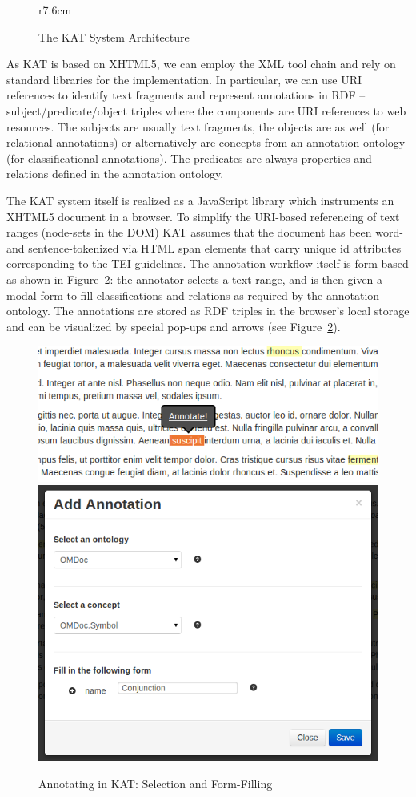 \documentclass{llncs}
\def\KAT{\textsf{KAT}\xspace}
\begin{document}
\begin{figure}r{7.6cm}\vspace*{-2em}
\def\localxscale{.85}\def\localyscale{1.35}
\caption{The \KAT System Architecture}\label{fig:kat-arch}\vspace*{-1em}
\end{figure}
As \KAT is based on XHTML5, we can employ the XML tool chain and rely on standard libraries
for the implementation. In particular, we can use URI references to identify text
fragments and represent annotations in RDF -- subject/predicate/object triples where the
components are URI references to web resources. The subjects are usually text fragments,
the objects are as well (for relational annotations) or alternatively are concepts from an annotation ontology (for
classificational annotations). The predicates are always properties and relations defined in the annotation ontology.

The \KAT system itself is realized as a JavaScript library which instruments an XHTML5
document in a browser. To simplify the URI-based referencing of text ranges (node-sets in
the DOM) \KAT assumes that the document has been word- and sentence-tokenized via
HTML \textsf{span} elements that carry unique \textsf{id} attributes corresponding to the
TEI guidelines. The annotation workflow itself is
form-based as shown in Figure~\ref{fig:kat-annotate}: the annotator selects a text range,
and is then given a modal form to fill classifications and relations as required by the
annotation ontology. The annotations are stored as RDF triples in the browser's local
storage and can be visualized by special pop-ups and arrows (see
Figure~\ref{fig:kat-annotate}).

\begin{figure}[ht]\centering
  \includegraphics[width=.57\textwidth]{../PIC/annotate}\quad
  \includegraphics[width=.37\textwidth]{../PIC/add-symbol}
  \caption{Annotating in \KAT: Selection and Form-Filling}\label{fig:kat-annotate}
\end{figure}
\end{document}
